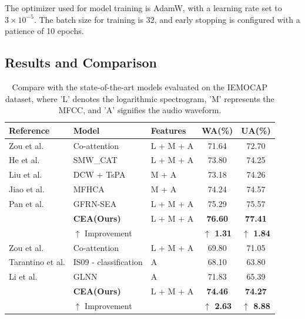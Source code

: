 \documentclass[runningheads]{llncs}
\begin{document}
The optimizer used for model training is AdamW, with a learning rate set to \( 3\times 10^{-5} \). The batch size for training is 32, and early stopping is configured with a patience of 10 epochs. 
\subsection{Results and Comparison}

\begin{table}[h]
\centering
\caption{Compare with the state-of-the-art models evaluated on the IEMOCAP dataset, where 'L' denotes the logarithmic spectrogram, 'M' represents the MFCC, and 'A' signifies the audio waveform.} %
\label{main_exp} %
\begin{tabular}{lllcc} 
\hline %
\textbf{Reference} & \textbf{Model} & \textbf{Features} & \textbf{WA}(\%) & \textbf{UA}(\%) \\
\hline %
Zou et al.\cite{b19} & Co-attention &  L + M + A  & 71.64 & 72.70 \\
He et al.\cite{b14} & SMW\_CAT & L + M + A  & 73.80 & 74.25 \\
Liu et al.\cite{b15} & DCW + TsPA & M + A  & 73.18 & 74.26 \\
Jiao et al.\cite{b16} & MFHCA & M + A  & 74.24 & 74.57 \\
Pan et al.\cite{b9} & GFRN-SEA & L + M + A  & 75.29 & 75.57 \\
\hline %
 \rowcolor[HTML]{EFEFEF} & \textbf{CEA(Ours)} & L + M + A & \textbf{76.60} & \textbf{77.41} \\
 &\textbf{$\uparrow$} Improvement      &   & \textcolor[HTML]{346B96}{\textbf{$\uparrow$ 1.31}}    &   \textcolor[HTML]{346B96}{\textbf{$\uparrow$ 1.84}} \\
\hline %
\hline %
Zou et al.\cite{b19} & Co-attention &  L + M + A  & 69.80 & 71.05 \\
Tarantino et al.\cite{b21} & IS09 - classification & A  & 68.10 & 63.80 \\
Li et al.\cite{b22} &GLNN & A  & 71.83 & 65.39 \\
\hline %
 \rowcolor[HTML]{EFEFEF}  & \textbf{CEA(Ours)} & L + M + A & \textbf{74.46} & \textbf{74.27} \\
  &\textbf{$\uparrow$} Improvement      &   & \textcolor[HTML]{346B96}{\textbf{$\uparrow$ 2.63}}    &   \textcolor[HTML]{346B96}{\textbf{$\uparrow$ 8.88}} \\
\hline %
\end{tabular}
\end{table}
\end{document}
